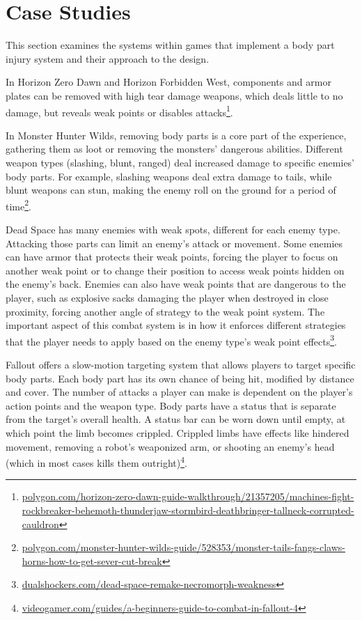 \section{Case Studies}
This section examines the systems within games that implement a body part injury system and their approach to the design.

In Horizon Zero Dawn and Horizon Forbidden West, components and armor plates can be removed with high tear damage weapons, which deals little to no damage, but reveals weak points or disables attacks\footnote{\href{https://www.polygon.com/horizon-zero-dawn-guide-walkthrough/21357205/machines-fight-rockbreaker-behemoth-thunderjaw-stormbird-deathbringer-tallneck-corrupted-cauldron/}{polygon.com/horizon-zero-dawn-guide-walkthrough/21357205/machines-fight-rockbreaker-behemoth-thunderjaw-stormbird-deathbringer-tallneck-corrupted-cauldron}}.

In Monster Hunter Wilds, removing body parts is a core part of the experience, gathering them as loot or removing the monsters' dangerous abilities. Different weapon types (slashing, blunt, ranged) deal increased damage to specific enemies' body parts. For example, slashing weapons deal extra damage to tails, while blunt weapons can stun, making the enemy roll on the ground for a period of time\footnote{\href{https://www.polygon.com/monster-hunter-wilds-guide/528353/monster-tails-fangs-claws-horns-how-to-get-sever-cut-break/}{polygon.com/monster-hunter-wilds-guide/528353/monster-tails-fangs-claws-horns-how-to-get-sever-cut-break}}.

Dead Space has many enemies with weak spots, different for each enemy type. Attacking those parts can limit an enemy's attack or movement. Some enemies can have armor that protects their weak points, forcing the player to focus on another weak point or to change their position to access weak points hidden on the enemy's back. Enemies can also have weak points that are dangerous to the player, such as explosive sacks damaging the player when destroyed in close proximity, forcing another angle of strategy to the weak point system. The important aspect of this combat system is in how it enforces different strategies that the player needs to apply based on the enemy type's weak point effects\footnote{\href{https://www.dualshockers.com/dead-space-remake-necromorph-weakness/}{dualshockers.com/dead-space-remake-necromorph-weakness}}.

Fallout offers a slow-motion targeting system that allows players to target specific body parts. Each body part has its own chance of being hit, modified by distance and cover. The number of attacks a player can make is dependent on the player's action points and the weapon type. Body parts have a status that is separate from the target's overall health. A status bar can be worn down until empty, at which point the limb becomes crippled. Crippled limbs have effects like hindered movement, removing a robot's weaponized arm, or shooting an enemy's head (which in most cases kills them outright)\footnote{\href{https://www.videogamer.com/guides/a-beginners-guide-to-combat-in-fallout-4/}{videogamer.com/guides/a-beginners-guide-to-combat-in-fallout-4}}.

